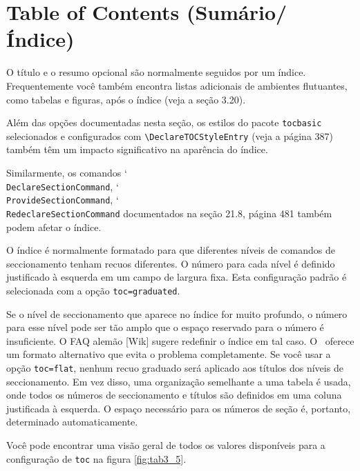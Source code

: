 \chapter[Table of Contents]{Table of Contents (Sumário/Índice)}

O título e o resumo opcional são normalmente seguidos por um índice. Frequentemente você também encontra listas adicionais de ambientes flutuantes, como tabelas e figuras, após o índice (veja a seção 3.20).

Além das opções documentadas nesta seção, os estilos do pacote \texttt{tocbasic} selecionados e configurados com
\verb|\DeclareTOCStyleEntry| (veja a página 387) também têm um impacto significativo na aparência do índice.

Similarmente, os comandos \char`\\\texttt{De\-cla\-re\-Sec\-tion\-Com\-mand}, \char`\\\texttt{Pro\-vi\-de\-Sec\-ti\-on\-Com\-mand}, \char`\\\texttt{Re\-de\-cla\-reSec\-ti\-onCom\-mand} documentados na seção 21.8, página 481 também podem afetar o índice.

O índice é normalmente formatado para que diferentes níveis de comandos de seccionamento tenham recuos diferentes. O número para cada nível é definido justificado à esquerda em um campo de largura fixa. Esta configuração padrão é selecionada com a opção \verb|toc=graduated|.

Se o nível de seccionamento que aparece no índice for muito profundo, o número para esse nível pode ser tão amplo que o espaço reservado para o número é insuficiente. O FAQ alemão [Wik] sugere redefinir o índice em tal caso. O \KOMAScript\ oferece um formato alternativo que evita o problema completamente. Se você usar a opção \verb|toc=flat|, nenhum recuo graduado será aplicado aos títulos dos níveis de seccionamento. Em vez disso, uma organização semelhante a uma tabela é usada, onde todos os números de seccionamento e títulos são definidos em uma coluna justificada à esquerda. O espaço necessário para os números de seção é, portanto, determinado automaticamente.

Você pode encontrar uma visão geral de todos os valores disponíveis para a configuração de \verb|toc| na figura \ref{fig:tab3_5}.

